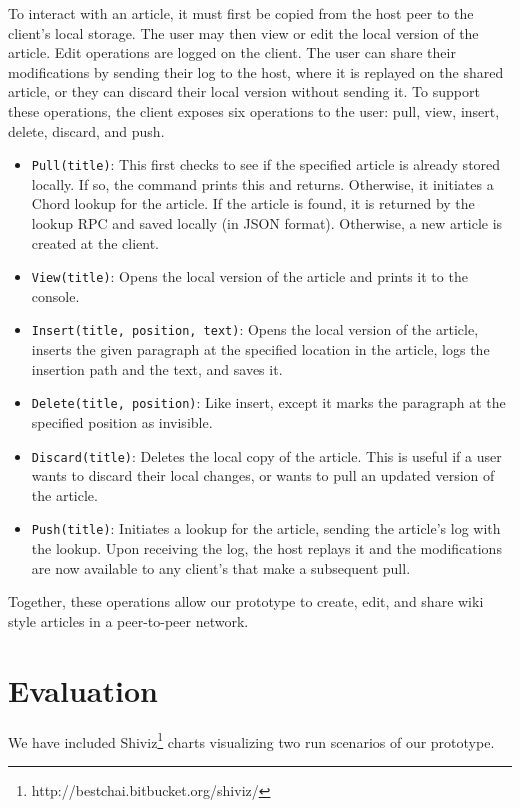 \documentclass[twocolumn]{article}
\begin{document}
To interact with an article, it must first be copied from the host peer to the client's local storage. The user may then view or edit the local version of the article. Edit operations are logged on the client. The user can share their modifications by sending their log to the host, where it is replayed on the shared article, or they can discard their local version without sending it. To support these operations, the client exposes six operations to the user: pull, view, insert, delete, discard, and push.
\begin{itemize}
  \item \texttt{Pull(title)}: This first checks to see if the specified article is already stored locally. If so, the command prints this and returns. Otherwise, it initiates a Chord lookup for the article. If the article is found, it is returned by the lookup RPC and saved locally (in JSON format). Otherwise, a new article is created at the client.
  \item \texttt{View(title)}: Opens the local version of the article and prints it to the console.
  \item \texttt{Insert(title, position, text)}: Opens the local version of the article, inserts the given paragraph at the specified location in the article, logs the insertion path and the text, and saves it.
  \item \texttt{Delete(title, position)}: Like insert, except it marks the paragraph at the specified position as invisible.
  \item \texttt{Discard(title)}: Deletes the local copy of the article. This is useful if a user wants to discard their local changes, or wants to pull an updated version of the article.
  \item \texttt{Push(title)}: Initiates a lookup for the article, sending the article's log with the lookup. Upon receiving the log, the host replays it and the modifications are now available to any client's that make a subsequent pull.
\end{itemize}
Together, these operations allow our prototype to create, edit, and share wiki style articles in a peer-to-peer network.

\section{Evaluation}
We have included Shiviz\footnote{http://bestchai.bitbucket.org/shiviz/} charts visualizing two run scenarios of our prototype.
\end{document}
